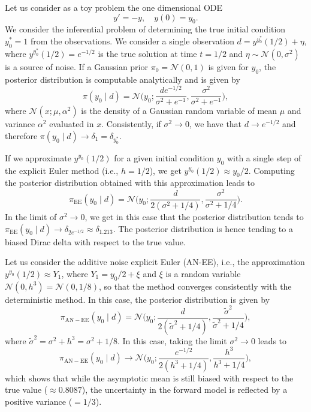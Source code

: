 \documentclass{siamart1116}
\title{{\TheTitle}}
\author{\empty}
\numberwithin{theorem}{section}
\begin{document}
\maketitle	

Let us consider as a toy problem the one dimensional ODE
\[
	y' = -y, \quad y(0) = y_0.
\]
We consider the inferential problem of determining the true initial condition $y_0^* = 1$ from the observations. We consider a single observation $d = y^{y_0^*}(1/2) + \eta$, where $y^{y_0^*}(1/2) = e^{-1/2}$ is the true solution at time $t =  1/2$ and $\eta \sim \mathcal N (0, \sigma^2)$ is a source of noise. If a Gaussian prior $\pi_0 = \mathcal N(0, 1)$ is given for $y_0$, the posterior distribution is computable analytically and is given by
\[
	\pi(y_0 \mid d) = \mathcal N\Big(y_0; \frac{de^{-1/2}}{\sigma^2 + e^{-1}}, \frac{\sigma^2}{\sigma^2 + e^{-1}}\Big),
\]
where $\mathcal N(x; \mu, \alpha^2)$ is the density of a Gaussian random variable of mean $\mu$ and variance $\alpha^2$ evaluated in $x$. Consistently, if $\sigma^2 \to 0$, we have that $d \to e^{-1/2}$ and therefore $\pi(y_0 \mid d) \to \delta_1 = \delta_{y_0^*}$. 

If we approximate $y^{y_0}(1/2)$ for a given initial condition $y_0$ with a single step of the explicit Euler method (i.e., $h = 1/2$), we get $y^{y_0}(1/2) \approx y_0 / 2$. Computing the posterior distribution obtained with this approximation leads to 
\[
	\pi_{\mathrm{EE}}(y_0 \mid d) = \mathcal N\Big(y_0; \frac{d}{2(\sigma^2 + 1/4)}, \frac{\sigma^2}{\sigma^2 + 1/4}\Big).
\]
In the limit of $\sigma^2 \to 0$, we get in this case that the posterior distribution tends to $\pi_{\mathrm{EE}}(y_0 \mid d) \to \delta_{2e^{-1/2}} \approx \delta_{1.213}$. The posterior distribution is hence tending to a biased Dirac delta with respect to the true value.

Let us consider the additive noise explicit Euler (AN-EE), i.e., the approximation $y^{y_0}(1/2) \approx Y_1$, where $Y_1 = y_0 / 2 + \xi$ and $\xi$ is a random variable $\mathcal N(0, h^3) = \mathcal N(0, 1/8)$, so that the method converges consistently with the deterministic method. In this case, the posterior distribution is given by
\[
	\pi_{\mathrm{AN-EE}}(y_0 \mid d) = \mathcal N\Big(y_0; \frac{d}{2(\tilde \sigma^2 + 1/4)}, \frac{\tilde \sigma^2}{\tilde \sigma^2 + 1/4}\Big),
\]
where $\tilde \sigma^2 = \sigma^2 + h^3 = \sigma^2 + 1/8$. In this case, taking the limit $\sigma^2 \to 0$ leads to 
\[
	\pi_{\mathrm{AN-EE}}(y_0 \mid d) \to \mathcal N\Big(y_0; \frac{e^{-1/2}}{2(h^3 + 1/4)}, \frac{h^3}{h^3 + 1/4}\Big),
\]
which shows that while the asymptotic mean is still biased with respect to the true value ($\approx 0.8087$), the uncertainty in the forward model is reflected by a positive variance ($= 1/3$).
\end{document}
